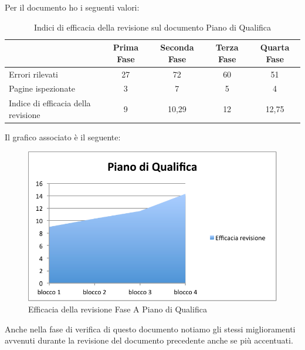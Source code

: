 						Per il documento  ho i seguenti valori:	
						\begin{table}[H]\centering
							\begin{tabu}{| l | c | c | c | c |}
								\hline
													&Prima Fase 	& Seconda Fase	& Terza Fase	& Quarta Fase  \\ \hline
												
								Errori rilevati				& 27		& 72 		& 60			& 51 	 \\ \hline
								Pagine ispezionate			& 3			& 7 			& 5				& 4	 	 \\ \hline\hline
							
								Indice di efficacia della revisione 	& 9		& 10,29 		& 12			& 12,75 	 \\ \hline
							\end{tabu}
							\caption{Indici di efficacia della revisione sul documento Piano di Qualifica}
						\end{table}
						Il grafico associato è il seguente:
						\begin{figure}[H]\centering
							\includegraphics[width=12cm]{PianoDiQualifica/Pics/EfficaciaPdQFaseA.pdf}
							\caption{Efficacia della revisione Fase A Piano di Qualifica}
						\end{figure}
						Anche nella fase di verifica di questo documento notiamo gli stessi miglioramenti avvenuti durante la revisione del documento precedente anche se più accentuati.\\
						
